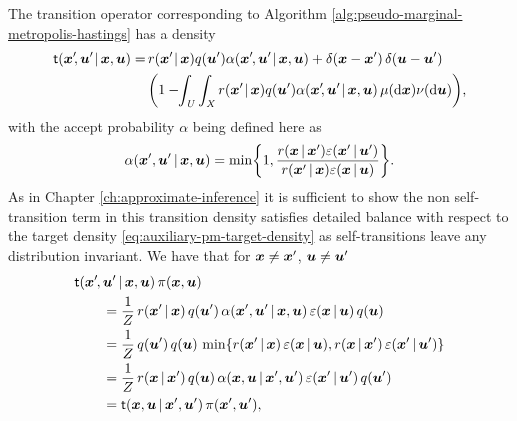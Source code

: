 The transition operator corresponding to Algorithm \ref{alg:pseudo-marginal-metropolis-hastings} has a density%
\begin{equation*}
\begin{split}
  \trans(\vct{x}'\kern-2pt,\vct{u}'\kern-1pt\gvn\vct{x},\vct{u}) =\,&
  r(\vct{x}'\kern-1pt\gvn\vct{x}) q(\vct{u}') \alpha(\vct{x}'\kern-1pt,\vct{u}'\kern-1pt\gvn\vct{x},\vct{u}) +
  \delta(\vct{x} - \vct{x}')\,\delta(\vct{u} -\vct{u}')\\
  &
  \lpa 
    1 - \kern-3pt
    \int_{\set{U}} \int_{\set{X}} 
      r(\vct{x}'\kern-1pt\gvn\vct{x}) q(\vct{u}') \alpha(\vct{x}'\kern-2pt,\vct{u}'\kern-1pt\gvn\vct{x},\vct{u})
    \,\mu(\dr\vct{x})\nu(\dr\vct{u})
  \rpa,
\end{split}
\end{equation*}
with the accept probability $\alpha$ being defined here as
\begin{equation}
  \alpha(\vct{x}',\vct{u}'\gvn\vct{x},\vct{u}) =
  \min\lbr 1, \frac{r(\vct{x}\gvn\vct{x}')\esttgtdens(\vct{x}'\gvn\vct{u}')}{r(\vct{x}'\gvn\vct{x})\esttgtdens(\vct{x}\gvn\vct{u})}\rbr.
\end{equation}
As in Chapter \ref{ch:approximate-inference} it is sufficient to show the non self-transition term in this transition density satisfies detailed balance with respect to the target density \eqref{eq:auxiliary-pm-target-density} as self-transitions leave any distribution invariant. We have that for $\boldsymbol{x} \neq \boldsymbol{x}'$, $\boldsymbol{u} \neq \boldsymbol{u}'$
\begin{equation}
\begin{split}
  &\trans(\vct{x}'\kern-1pt,\vct{u}'\gvn\vct{x},\vct{u}) \, \pi(\vct{x},\vct{u}) \\
  &\qquad=
  \frac{1}{Z} \, r(\vct{x}'\gvn\vct{x}) \, q(\vct{u}')\, 
  \alpha(\vct{x}',\vct{u}'\gvn\vct{x},\vct{u}) \,
 \esttgtdens(\vct{x}\gvn\vct{u})\,q(\vct{u})\\
  &\qquad=
  \frac{1}{Z} \,q(\vct{u}')\,q(\vct{u})\, 
  \min\lbr 
    r(\vct{x}'\gvn\vct{x})\,\esttgtdens(\vct{x}\gvn\vct{u}),
    r(\vct{x}\gvn\vct{x}')\,\esttgtdens(\vct{x}'\gvn\vct{u}')
  \rbr
  \\
  &\qquad=
  \frac{1}{Z} \, r(\vct{x}\gvn\vct{x}') \, q(\vct{u})\, 
  \alpha(\vct{x},\vct{u}\gvn\vct{x}',\vct{u}') \,
 \esttgtdens(\vct{x}'\gvn\vct{u}')\,q(\vct{u}')\\
 &\qquad=
 \trans(\vct{x},\vct{u}\gvn\vct{x}',\vct{u}') \, \pi(\vct{x}',\vct{u}'),
\end{split}
\end{equation}
